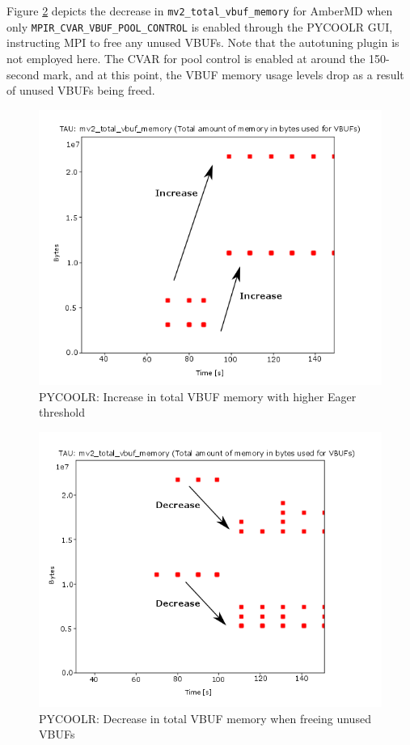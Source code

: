 Figure \ref{fig:pycoolrdecr} depicts the decrease in \verb+mv2_total_vbuf_memory+ for AmberMD when only \verb+MPIR_CVAR_VBUF_POOL_CONTROL+ is enabled through the PYCOOLR GUI, instructing MPI to free any unused VBUFs. Note that the autotuning plugin is not employed here. The CVAR for pool control is enabled at around the 150-second mark, and at this point, the VBUF memory usage levels drop as a result of unused VBUFs being freed.
 \begin{figure}[tbp!]
  \centering
  \captionsetup{justification=centering}
  \includegraphics[scale=0.45,keepaspectratio]{figures/Pycoolr-Eager-Part1-plot3-arrows-unblur}
 \caption{PYCOOLR: Increase in total VBUF memory with higher Eager threshold}
 \label{fig:pycoolrincr}
\end{figure}

 \begin{figure}[tbp!]
 \centering
  \captionsetup{justification=centering}
 \includegraphics[scale=0.45,keepaspectratio]{figures/Pycoolr-Eager-Part2-plot3-arrows-unblur}
 \caption{PYCOOLR: Decrease in total VBUF memory when freeing unused VBUFs}
 \label{fig:pycoolrdecr}
\end{figure}

